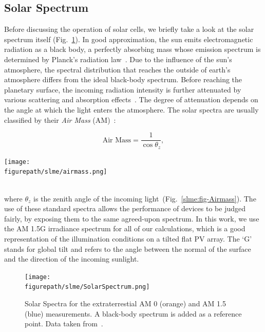\begin{refsection}
\subsection{Solar Spectrum} 
 
Before discussing the operation of solar cells, we briefly take a look at the 
solar spectrum itself (Fig.~\ref{slme:fig-solar}). In good approximation, the 
sun emits electromagnetic radiation as a black body, a perfectly absorbing 
mass whose emission spectrum is determined by Planck's radiation 
law~\cite{Planck1901}. Due to the influence of the sun's atmosphere, the 
spectral distribution that reaches the outside of earth's atmosphere differs 
from the ideal black-body spectrum. Before reaching the planetary surface, the 
incoming radiation intensity is further attenuated by various scattering and 
absorption effects~\cite{Bird1986}. The degree of attenuation depends on the 
angle at which the light enters the atmosphere. The solar spectra are usually 
classified by their \textit{Air Mass} (AM)~\cite{Green1981}: 
\begin{minipage}{1\textwidth} 
\begin{minipage}{0.4\textwidth} 
\begin{equation} 
\text{Air Mass} = \frac{1}{\cos \theta_z}, 
\end{equation} 
\end{minipage} 
\begin{minipage}{0.6\textwidth} 
\centering 
\texttt{[image: \\figurepath/slme/airmass.png]} 
\end{minipage} 
\end{minipage} 
\vspace{0.2in}\\ 
where $\theta_z$ is the zenith angle of the incoming 
light~(Fig.~\ref{slme:fig-Airmass}). The use of these standard spectra allows 
the performance of devices to be judged fairly, by exposing them to the same 
agreed-upon spectrum. In this work, we use the AM 1.5G irradiance spectrum for 
all of our calculations, which is a good representation of the illumination conditions on a tilted flat PV array. The `G' stands for global tilt and
refers to the angle between the normal of the surface and the direction of the 
incoming sunlight. 
 
\begin{figure}[ht]
\captionsetup{width=0.9\textwidth}
\centering 
\texttt{[image: \\figurepath/slme/SolarSpectrum.png]} 
\caption{\label{slme:fig-solar} Solar Spectra for the extraterrestial AM 0 
(orange) and AM 1.5 (blue) measurements. A black-body spectrum is added as a 
reference point. Data taken from~\cite{International2012}.} 
\end{figure} 
 

\end{refsection}
